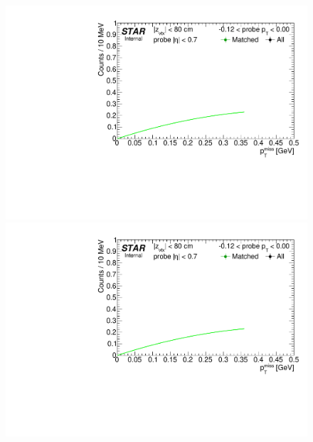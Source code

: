 \begin{figure}[h!]
{}%
\end{figure}%
\begin{figure}[ht]\ContinuedFloat
\centering
\parbox{0.495\textwidth}{
  \centering
  \includegraphics[width=\linewidth,page=7]{graphics/systematicsEfficiency/TOF_tagAndProbe/Fitting_effVsPt_data.pdf}\\
  \includegraphics[width=\linewidth,page=8]{graphics/systematicsEfficiency/TOF_tagAndProbe/Fitting_effVsPt_data.pdf}\\
}
\end{figure}
